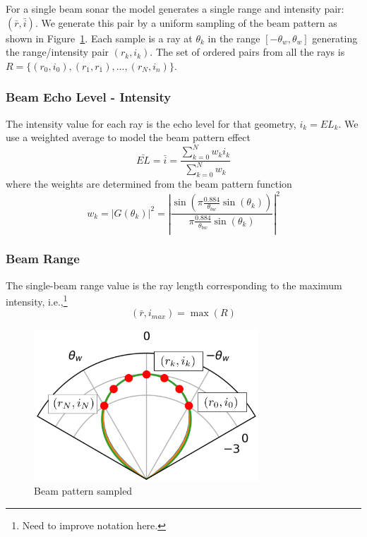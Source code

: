 \documentclass[11pt]{article}
\begin{document}
For a single beam sonar the model generates a single range and intensity pair: $(\bar{r},\bar{i})$.  We generate this pair by a uniform sampling of the beam pattern as shown in Figure~\ref{f:bpsampled}.  Each sample is a ray at $\theta_k$ in the range $[-\theta_w, \theta_w]$ generating the range/intensity pair $(r_k,i_k)$.  The set of ordered pairs from all the rays is $R = \{(r_0,i_0),(r_1,r_1),\ldots,(r_N,i_n)\}$.

\subsubsection{Beam Echo Level - Intensity}

The intensity value for each ray is the echo level for that geometry, $i_k = EL_k$.  We use a weighted average to model the beam pattern effect
\begin{equation}
\bar{EL} = \bar{i} = \frac{ \sum_{k=0}^{N} w_k i_k }{\sum_{k=0}^N w_k}
\end{equation}
where the weights are determined from the beam pattern function
\begin{equation}
w_k = \left| G(\theta_k) \right|^2 = \left| \frac{\sin(\pi \frac{0.884}{\theta_{bw}} \sin(\theta_k))}{\pi \frac{0.884}{\theta_{bw}} \sin(\theta_k)} \right|^2
\end{equation}

\subsubsection{Beam Range}
The single-beam range value is the ray length corresponding to the maximum intensity, i.e.,\footnote{Need to improve notation here.}
\begin{equation}
(\bar{r},i_{max}) = \max(R)
\end{equation}


\begin{figure}[hbt!]
  \centering
  \includegraphics[width=0.75\textwidth]{src/single_beam/single_beam_sampled_annote.png}
  \caption{Beam pattern sampled}
  \label{f:bpsampled}
\end{figure}
\end{document}

